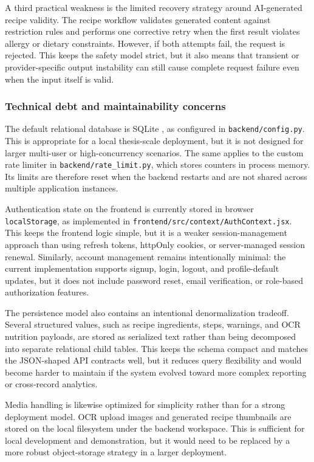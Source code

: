 A third practical weakness is the limited recovery strategy around
AI-generated recipe validity. The recipe workflow validates generated
content against restriction rules and performs one corrective retry when
the first result violates allergy or dietary constraints. However, if
both attempts fail, the request is rejected. This keeps the safety model
strict, but it also means that transient or provider-specific output
instability can still cause complete request failure even when the input
itself is valid.

\subsubsection{Technical debt and maintainability concerns}

The default relational database is SQLite \cite{sqlite2026docs}, as configured in
\texttt{backend/config.py}. This is appropriate for a local thesis-scale
deployment, but it is not designed for larger multi-user or
high-concurrency scenarios. The same applies to the custom rate limiter
in \texttt{backend/rate\_limit.py}, which stores counters in process
memory. Its limits are therefore reset when the backend restarts and are
not shared across multiple application instances.

Authentication state on the frontend is currently stored in browser
\texttt{localStorage}, as implemented in
\texttt{frontend/src/context/AuthContext.jsx}. This keeps the frontend
logic simple, but it is a weaker session-management approach than using
refresh tokens, httpOnly cookies, or server-managed session renewal.
Similarly, account management remains intentionally minimal: the current
implementation supports signup, login, logout, and profile-default
updates, but it does not include password reset, email verification, or
role-based authorization features.

The persistence model also contains an intentional denormalization
tradeoff. Several structured values, such as recipe ingredients, steps,
warnings, and OCR nutrition payloads, are stored as serialized text
rather than being decomposed into separate relational child tables. This
keeps the schema compact and matches the JSON-shaped API contracts
\cite{json2017rfc8259} well,
but it reduces query flexibility and would become harder to maintain if
the system evolved toward more complex reporting or cross-record
analytics.

Media handling is likewise optimized for simplicity rather than for a
strong deployment model. OCR upload images and generated recipe
thumbnails are stored on the local filesystem under the backend
workspace. This is sufficient for local development and demonstration,
but it would need to be replaced by a more robust object-storage
strategy in a larger deployment.

